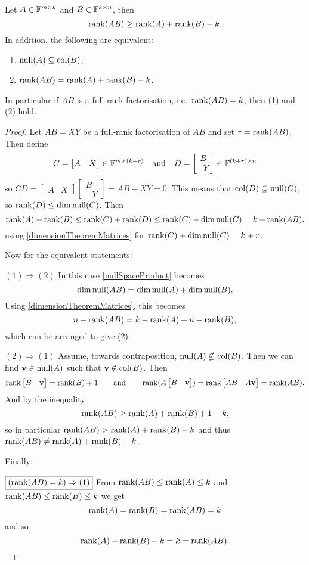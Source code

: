 \begin{proposition} \label{SylvesterRankInequality}
Let $A\in\mathbb{F}^{m\times k}$ and $B\in\mathbb{F}^{k\times n}$, then
\[ \operatorname{rank}(AB) \geq \operatorname{rank}(A)+\operatorname{rank}(B) - k. \]
In addition, the following are equivalent:
\begin{enumerate}
\item $\operatorname{null}(A)\subseteq \operatorname{col}(B)$;
\item $\operatorname{rank}(AB) = \operatorname{rank}(A)+\operatorname{rank}(B) - k$.
\end{enumerate}
In particular if $AB$ is a full-rank factorisation, i.e.\ $\operatorname{rank}(AB) = k$, then (1) and (2) hold.
\end{proposition}
\begin{proof}
Let $AB = XY$ be a full-rank factorisation of $AB$ and set $r=\operatorname{rank}(AB)$. Then define
\[ C = \begin{bmatrix}
A & X
\end{bmatrix}\in\mathbb{F}^{m\times(k+r)} \quad\text{and}\quad D=\begin{bmatrix}
B \\ -Y
\end{bmatrix}\in\mathbb{F}^{(k+r)\times n}\]
so $CD = \begin{bmatrix}
A & X
\end{bmatrix}\begin{bmatrix}
B \\ -Y
\end{bmatrix} = AB-XY = 0$.
This means that $\operatorname{col}(D)\subseteq \operatorname{null}(C)$, so $\operatorname{rank}(D)\leq \dim\operatorname{null}(C)$. Then
\[ \operatorname{rank}(A) + \operatorname{rank}(B) \leq \operatorname{rank}(C) + \operatorname{rank}(D) \leq \operatorname{rank}(C) + \dim\operatorname{null}(C) = k+\operatorname{rank}(AB). \]
using \ref{dimensionTheoremMatrices} for $\operatorname{rank}(C) + \dim\operatorname{null}(C) = k+r$.

Now for the equivalent statements:

$\boxed{(1)\Rightarrow (2)}$ In this case \ref{nullSpaceProduct} becomes
\[ \dim\operatorname{null}(AB) = \dim\operatorname{null}(A) + \dim\operatorname{null}(B). \]
Using \ref{dimensionTheoremMatrices}, this becomes
\[ n - \operatorname{rank}(AB) = k-\operatorname{rank}(A) + n-\operatorname{rank}(B), \]
which can be arranged to give (2).

$\boxed{(2)\Rightarrow (1)}$ Assume, towards contraposition, $\operatorname{null}(A) \nsubseteq \operatorname{col}(B)$. Then we can find $\boldsymbol{\mathrm{v}}\in\operatorname{null}(A)$ such that $\boldsymbol{\mathrm{v}}\notin \operatorname{col}(B)$. Then
\[ \operatorname{rank} \begin{bmatrix}
B & \boldsymbol{\mathrm{v}}
\end{bmatrix} = \operatorname{rank}(B) + 1 \qquad\text{and}\qquad \operatorname{rank}(A \begin{bmatrix}
B & \boldsymbol{\mathrm{v}}
\end{bmatrix}) = \operatorname{rank}\begin{bmatrix}
AB & A\boldsymbol{\mathrm{v}}
\end{bmatrix} = \operatorname{rank}(AB). \]
And by the inequality
\[ \operatorname{rank}(AB) \geq \operatorname{rank}(A)+\operatorname{rank}(B)+1-k, \]
so in particular $\operatorname{rank}(AB) > \operatorname{rank}(A)+\operatorname{rank}(B)-k$ and thus $\operatorname{rank}(AB) \neq \operatorname{rank}(A)+\operatorname{rank}(B)-k$.

Finally:

$\boxed{(\operatorname{rank}(AB) = k)\Rightarrow (1)}$ From $\operatorname{rank}(AB)\leq\operatorname{rank}(A)\leq k$ and $\operatorname{rank}(AB)\leq\operatorname{rank}(B)\leq k$ we get
\[ \operatorname{rank}(A) = \operatorname{rank}(B) = \operatorname{rank}(AB) = k \]
and so
\[ \operatorname{rank}(A) + \operatorname{rank}(B) - k = k =\operatorname{rank}(AB). \]
\end{proof}
